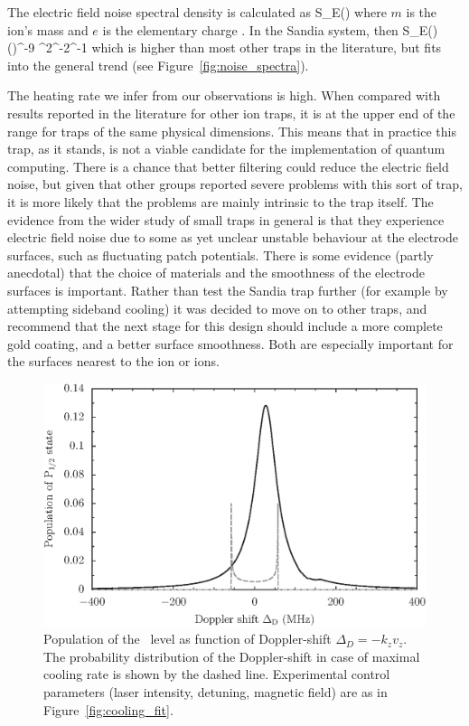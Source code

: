 The electric field noise spectral density is calculated as
\be
S_E(\omega) \approx {}
\ee
where $m$ is the ion's mass and $e$ is the elementary charge \cite{Turchette2000}. In the Sandia system, then
\be
S_E(\omega) ()^{-9} \V^2\m^{-2}\Hz^{-1}
\ee
which is higher than most other traps in the literature, but fits into the general trend (see Figure~\ref{fig:noise_spectra}). 

The heating rate we infer from our observations is high. When compared with results reported in the literature for other ion traps, it is at the upper end of the range for traps of the same physical dimensions. This means that in practice this trap, as it stands, is not a viable candidate for the implementation of quantum computing. There is a
chance that better filtering could reduce the electric field noise, but given that other groups reported severe problems with this sort of trap, it is more likely that the problems are mainly intrinsic to the trap itself. The evidence from the wider study of small traps in general is that they experience electric field noise due to some as yet unclear unstable behaviour at the electrode surfaces, such as fluctuating  patch potentials. There is some evidence (partly anecdotal) that the choice of materials and the smoothness of the electrode surfaces is important. Rather than test the Sandia trap further (for example by attempting sideband cooling) it was decided to move on to other traps, and recommend that the next stage for this design should include a more complete gold coating, and a better surface smoothness. Both are especially important for the surfaces nearest to the ion or ions.


\begin{figure}[h!t]
\centering
\includegraphics{chapter7/heating/sample_dopplerpop_v2}
\caption[Doppler-broadened fluorescence profile]{Population of the \poh\, level as function of Doppler-shift $\Delta_D=-k_zv_z$. The probability distribution of the Doppler-shift in case of maximal cooling rate is shown by the dashed line. Experimental control parameters (laser intensity, detuning, magnetic field) are as in Figure~\ref{fig:cooling_fit}.}
\label{fig:dbroadprofile}
\end{figure} 

